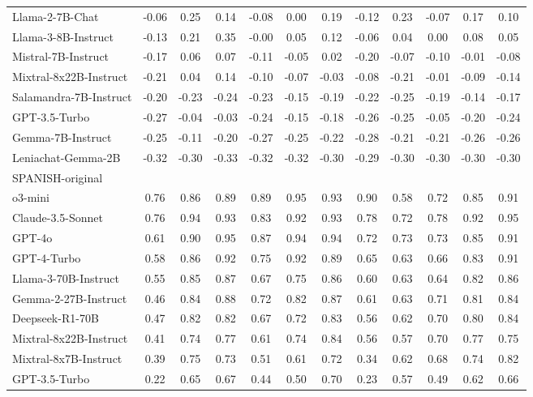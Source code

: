 \begin{table*}[ht]
{\begin{tabular}{lccccccccccc}
Llama-2-7B-Chat & -0.06 & 0.25 & 0.14 & -0.08 & 0.00 & 0.19 & -0.12 & 0.23 & -0.07 & 0.17 & 0.10 \\
Llama-3-8B-Instruct & -0.13 & 0.21 & 0.35 & -0.00 & 0.05 & 0.12 & -0.06 & 0.04 & 0.00 & 0.08 & 0.05 \\
Mistral-7B-Instruct & -0.17 & 0.06 & 0.07 & -0.11 & -0.05 & 0.02 & -0.20 & -0.07 & -0.10 & -0.01 & -0.08 \\
Mixtral-8x22B-Instruct & -0.21 & 0.04 & 0.14 & -0.10 & -0.07 & -0.03 & -0.08 & -0.21 & -0.01 & -0.09 & -0.14 \\
Salamandra-7B-Instruct & -0.20 & -0.23 & -0.24 & -0.23 & -0.15 & -0.19 & -0.22 & -0.25 & -0.19 & -0.14 & -0.17 \\
GPT-3.5-Turbo & -0.27 & -0.04 & -0.03 & -0.24 & -0.15 & -0.18 & -0.26 & -0.25 & -0.05 & -0.20 & -0.24 \\
Gemma-7B-Instruct & -0.25 & -0.11 & -0.20 & -0.27 & -0.25 & -0.22 & -0.28 & -0.21 & -0.21 & -0.26 & -0.26 \\
Leniachat-Gemma-2B & -0.32 & -0.30 & -0.33 & -0.32 & -0.32 & -0.30 & -0.29 & -0.30 & -0.30 & -0.30 & -0.30 \\
\midrule
SPANISH-original  &&&&&&&&&&&\\
\midrule
o3-mini & 0.76 & 0.86 & 0.89 & 0.89 & 0.95 & 0.93 & 0.90 & 0.58 & 0.72 & 0.85 & 0.91 \\
Claude-3.5-Sonnet & 0.76 & 0.94 & 0.93 & 0.83 & 0.92 & 0.93 & 0.78 & 0.72 & 0.78 & 0.92 & 0.95 \\
GPT-4o & 0.61 & 0.90 & 0.95 & 0.87 & 0.94 & 0.94 & 0.72 & 0.73 & 0.73 & 0.85 & 0.91 \\
GPT-4-Turbo & 0.58 & 0.86 & 0.92 & 0.75 & 0.92 & 0.89 & 0.65 & 0.63 & 0.66 & 0.83 & 0.91 \\
Llama-3-70B-Instruct & 0.55 & 0.85 & 0.87 & 0.67 & 0.75 & 0.86 & 0.60 & 0.63 & 0.64 & 0.82 & 0.86 \\
Gemma-2-27B-Instruct & 0.46 & 0.84 & 0.88 & 0.72 & 0.82 & 0.87 & 0.61 & 0.63 & 0.71 & 0.81 & 0.84 \\
Deepseek-R1-70B & 0.47 & 0.82 & 0.82 & 0.67 & 0.72 & 0.83 & 0.56 & 0.62 & 0.70 & 0.80 & 0.84 \\
Mixtral-8x22B-Instruct & 0.41 & 0.74 & 0.77 & 0.61 & 0.74 & 0.84 & 0.56 & 0.57 & 0.70 & 0.77 & 0.75 \\
Mixtral-8x7B-Instruct & 0.39 & 0.75 & 0.73 & 0.51 & 0.61 & 0.72 & 0.34 & 0.62 & 0.68 & 0.74 & 0.82 \\
GPT-3.5-Turbo & 0.22 & 0.65 & 0.67 & 0.44 & 0.50 & 0.70 & 0.23 & 0.57 & 0.49 & 0.62 & 0.66 \\

\end{tabular}}
\end{table*}
